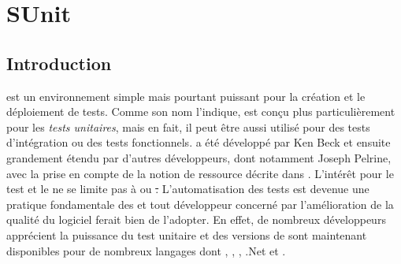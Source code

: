 \documentclass[a4paper,10pt,twoside]{book}
\begin{document}
	\renewcommand{\nnbb}[2]{} %
	\sloppy
\fi
\newcommand{\aconfirmer}[1]{#1}
\chapter{SUnit}
\label{cha:SUnit}

\section{Introduction}


 est un environnement simple mais pourtant puissant 
pour la création et le déploiement de tests.
Comme son nom l'indique, \sunit est conçu plus particulièrement pour les \emph{tests unitaires},
mais en fait, il peut être aussi utilisé pour des tests d'intégration ou des tests fonctionnels. 
\sunit a été développé par Ken Beck et ensuite grandement étendu par d'autres développeurs, dont notamment Joseph Pelrine, avec la prise en compte de la notion de ressource décrite dans . 
L'intérêt pour le test et le  ne se limite pas à \sq ou \st.
L'automatisation des tests est devenue une pratique fondamentale des  et 
tout développeur concerné par l'amélioration de la qualité du logiciel ferait bien de l'adopter.  
En effet, de nombreux développeurs apprécient la puissance du test unitaire et des versions de \xUnit{} sont maintenant disponibles pour de nombreux langages dont , , , .Net et .
\end{document}
